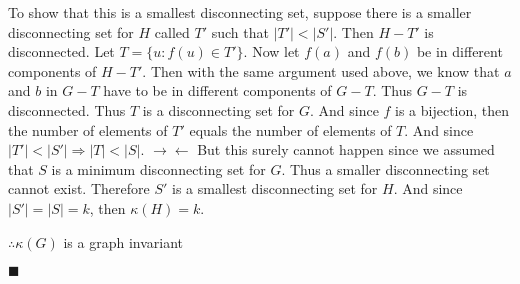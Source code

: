 \documentclass{article}
\begin{document}
\vspace{2mm} 
To show that this is a smallest disconnecting set, suppose there is a smaller disconnecting set for \(H\) called \(T'\) such that \( |T'| < |S'|\). Then \(H - T'\) is disconnected. Let \(T = \{u : f(u) \in T'\}\). Now let \(f(a)\) and \(f(b)\) be in different components of \(H-T'\). Then with the same argument used above, we know that \(a\) and \(b\) in \(G-T\) have to be in different components of \(G-T\). Thus \(G-T\) is disconnected. Thus \(T\) is a disconnecting set for \(G\). And since \(f\) is a bijection, then the number of elements of \(T'\) equals the number of elements of \(T\). And since \(|T'| < |S'| \Rightarrow |T| <|S|\). \(\rightarrow\!\leftarrow\) But this surely cannot happen since we assumed that \(S\) is a minimum disconnecting set for \(G\). Thus a smaller disconnecting set cannot exist. Therefore \(S'\) is a smallest disconnecting set for \(H\). And since \(|S'| =|S|=k\), then \(\kappa(H) = k\). 

\(\therefore \kappa(G) \) is a graph invariant

\begin{flushright}
\(\blacksquare\)
\end{flushright}
\end{document}
